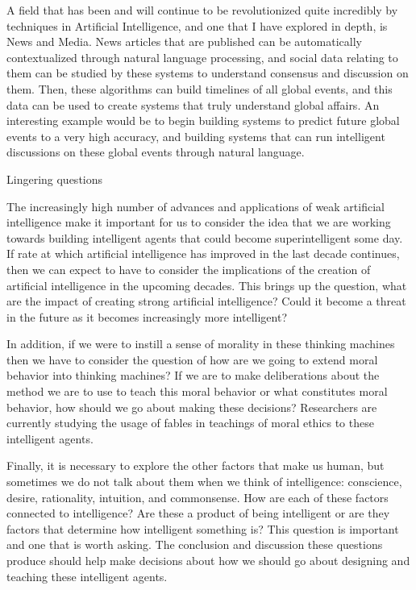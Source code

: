 \documentclass[11pt]{article}
\begin{document}
\par A field that has been and will continue to be revolutionized quite incredibly by techniques in Artificial Intelligence, and one that I have explored in depth, is News and Media. News articles that are published can be automatically contextualized through natural language processing, and social data relating to them can be studied by these systems to understand consensus and discussion on them. Then, these algorithms can build timelines of all global events, and this data can be used to create systems that truly understand global affairs. An interesting example would be to begin building systems to predict future global events to a very high accuracy, and building systems that can run intelligent discussions on these global events through natural language.

\begin{center}
	{\large Lingering questions\par}
\end{center}

\par The increasingly high number of advances and applications of weak artificial intelligence make it important for us to consider the idea that we are working towards building intelligent agents that could become superintelligent some day. If rate at which artificial intelligence has improved in the last decade continues, then we can expect to have to consider the implications of the creation of artificial intelligence in the upcoming decades. This brings up the question, what are the impact of creating strong artificial intelligence? Could it become a threat in the future as it becomes increasingly more intelligent?

\par In addition, if we were to instill a sense of morality in these thinking machines then we have to consider the question of how are we going to extend moral behavior into thinking machines? If we are to make deliberations about the method we are to use to teach this moral behavior or what constitutes moral behavior, how should we go about making these decisions? Researchers are currently studying the usage of fables in teachings of moral ethics to these intelligent agents.

\par Finally, it is necessary to explore the other factors that make us human, but sometimes we do not talk about them when we think of intelligence: conscience, desire, rationality, intuition, and commonsense. How are each of these factors connected to intelligence? Are these a product of being intelligent or are they factors that determine how intelligent something is? This question is important and one that is worth asking. The conclusion and discussion these questions produce should help make decisions about how we should go about designing and teaching these intelligent agents.
\end{document}
